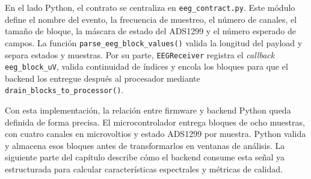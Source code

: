 En el lado Python, el contrato se centraliza en \texttt{eeg\_contract.py}. Este módulo define el nombre del evento, la frecuencia de muestreo, el número de canales, el tamaño de bloque, la máscara de estado del ADS1299 y el número esperado de campos. La función \texttt{parse\_eeg\_block\_values()} valida la longitud del payload y separa estados y muestras. Por su parte, \texttt{EEGReceiver} registra el \textit{callback} \texttt{eeg\_block\_uV}, valida continuidad de índices y encola los bloques para que el backend los entregue después al procesador mediante \texttt{drain\_blocks\_to\_processor()}.

Con esta implementación, la relación entre firmware y backend Python queda definida de forma precisa. El microcontrolador entrega bloques de ocho muestras, con cuatro canales en microvoltios y estado ADS1299 por muestra. Python valida y almacena esos bloques antes de transformarlos en ventanas de análisis. La siguiente parte del capítulo describe cómo el backend consume esta señal ya estructurada para calcular características espectrales y métricas de calidad.
